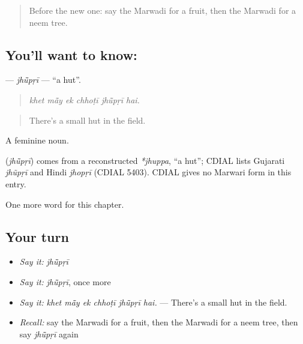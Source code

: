 \begin{quote}
Before the new one: say the Marwadi for a fruit, then the Marwadi for a neem tree.
\end{quote}

\subsection*{You'll want to know: }
\textbf{} — \emph{jhū̃pṛī} — \textquotedblleft{}a hut\textquotedblright{}.

\begin{quote}
     
\end{quote}

\begin{quote}
\emph{khet mā̃y ek chhoṭī jhū̃pṛī hai.}
\end{quote}

\begin{quote}
There's a small hut in the field.
\end{quote}

A feminine noun.

\begin{cousinweb}
\textbf{} (\emph{jhū̃pṛī}) comes from a reconstructed \emph{*jhuppa}, \textquotedblleft{}a hut\textquotedblright{}; CDIAL lists Gujarati \emph{jhũpṛī} and Hindi \emph{jhopṛī} (CDIAL 5403). CDIAL gives no Marwari form in this entry.
\end{cousinweb}

\begin{grammarlens}[title={What you've built}]
One more word for this chapter.
\end{grammarlens}

\subsection*{Your turn}
\begin{itemize}
\raggedright
  \item \emph{Say it:} \emph{jhū̃pṛī}
  \item \emph{Say it:} \emph{jhū̃pṛī}, once more
  \item \emph{Say it:} \emph{khet mā̃y ek chhoṭī jhū̃pṛī hai.} — There's a small hut in the field.
  \item \emph{Recall:} say the Marwadi for a fruit, then the Marwadi for a neem tree, then say \emph{jhū̃pṛī} again
\end{itemize}

